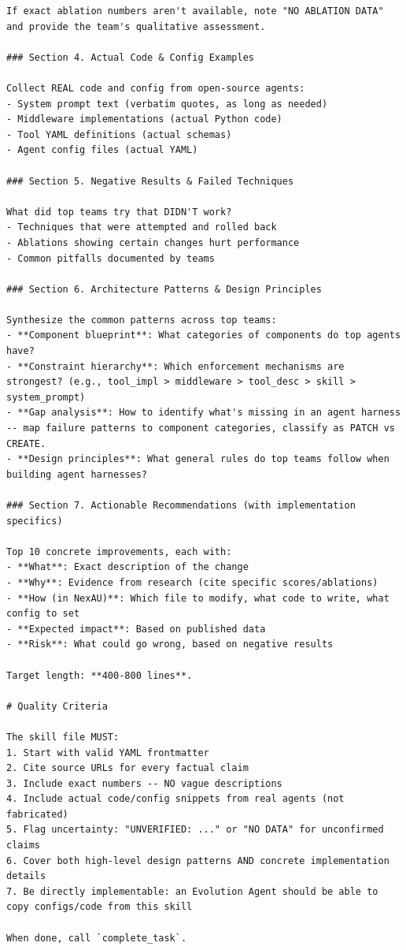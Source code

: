 \begin{tcolorbox}
\begin{lstlisting}
If exact ablation numbers aren't available, note "NO ABLATION DATA" and provide the team's qualitative assessment.

### Section 4. Actual Code & Config Examples

Collect REAL code and config from open-source agents:
- System prompt text (verbatim quotes, as long as needed)
- Middleware implementations (actual Python code)
- Tool YAML definitions (actual schemas)
- Agent config files (actual YAML)

### Section 5. Negative Results & Failed Techniques

What did top teams try that DIDN'T work?
- Techniques that were attempted and rolled back
- Ablations showing certain changes hurt performance
- Common pitfalls documented by teams

### Section 6. Architecture Patterns & Design Principles

Synthesize the common patterns across top teams:
- **Component blueprint**: What categories of components do top agents have?
- **Constraint hierarchy**: Which enforcement mechanisms are strongest? (e.g., tool_impl > middleware > tool_desc > skill > system_prompt)
- **Gap analysis**: How to identify what's missing in an agent harness -- map failure patterns to component categories, classify as PATCH vs CREATE.
- **Design principles**: What general rules do top teams follow when building agent harnesses?

### Section 7. Actionable Recommendations (with implementation specifics)

Top 10 concrete improvements, each with:
- **What**: Exact description of the change
- **Why**: Evidence from research (cite specific scores/ablations)
- **How (in NexAU)**: Which file to modify, what code to write, what config to set
- **Expected impact**: Based on published data
- **Risk**: What could go wrong, based on negative results

Target length: **400-800 lines**.

# Quality Criteria

The skill file MUST:
1. Start with valid YAML frontmatter
2. Cite source URLs for every factual claim
3. Include exact numbers -- NO vague descriptions
4. Include actual code/config snippets from real agents (not fabricated)
5. Flag uncertainty: "UNVERIFIED: ..." or "NO DATA" for unconfirmed claims
6. Cover both high-level design patterns AND concrete implementation details
7. Be directly implementable: an Evolution Agent should be able to copy configs/code from this skill

When done, call `complete_task`.
\end{lstlisting}
\end{tcolorbox}

